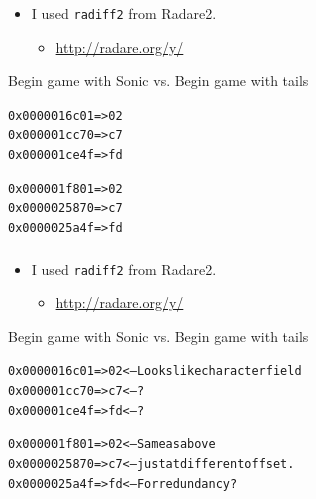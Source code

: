 \documentclass{beamer}
\begin{document}

\begin{frame}[fragile]
\frametitle{\insertsubsection}

\begin{itemize}
\item I used \texttt{radiff2} from Radare2.
\begin{itemize}
\item \url{http://radare.org/y/}
\end{itemize}
\end{itemize}

\vfill

\begin{block}{Begin game with Sonic vs. Begin game with tails}

\begin{alltt}
0x0000016c 01 => 02		
0x000001cc 70 => c7		
0x000001ce 4f => fd		

0x000001f8 01 => 02     
0x00000258 70 => c7		
0x0000025a 4f => fd		
\end{alltt}
\end{block}

\vfill

\end{frame}



\begin{frame}[fragile]
\frametitle{\insertsubsection}

\begin{itemize}
\item I used \texttt{radiff2} from Radare2.
\begin{itemize}
\item \url{http://radare.org/y/}
\end{itemize}
\end{itemize}

\vfill

\begin{block}{Begin game with Sonic vs. Begin game with tails}

\begin{alltt}
0x0000016c 01 => 02		  <--- Looks like character field
0x000001cc 70 => c7		  <--- ?
0x000001ce 4f => fd		  <--- ?

0x000001f8 01 => 02		  <--- Same as above
0x00000258 70 => c7		  <--- just at different offset.
0x0000025a 4f => fd		  <--- For redundancy?
\end{alltt}
\end{block}

\vfill

\end{frame}
\end{document}
